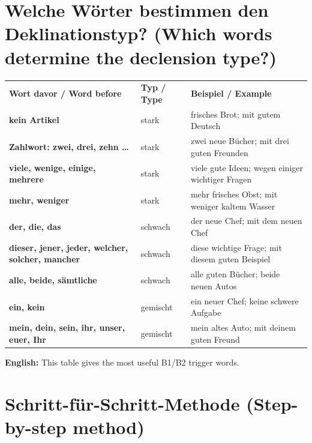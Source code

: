 \documentclass[a4paper,11pt]{article}
\newcommand{\TableEnglish}[1]{{\small\color{SoftGray}\textbf{English: }#1\par}}
\begin{document}
\section{Welche Wörter bestimmen den Deklinationstyp? \textnormal{(Which words determine the declension type?)}}

\begin{longtable}{>{\bfseries}p{3.6cm}|p{4.2cm}|p{7cm}}
\rowcolor{HeaderBlueDark}
\color{white}\textbf{Wort davor / Word before} &
\color{white}\textbf{Typ / Type} &
\color{white}\textbf{Beispiel / Example} \\
kein Artikel & stark & frisches Brot; mit gutem Deutsch \\
Zahlwort: zwei, drei, zehn \ldots & stark & zwei neue Bücher; mit drei guten Freunden \\
viele, wenige, einige, mehrere & stark & viele gute Ideen; wegen einiger wichtiger Fragen \\
mehr, weniger & stark & mehr frisches Obst; mit weniger kaltem Wasser \\
der, die, das & schwach & der neue Chef; mit dem neuen Chef \\
dieser, jener, jeder, welcher, solcher, mancher & schwach & diese wichtige Frage; mit diesem guten Beispiel \\
alle, beide, sämtliche & schwach & alle guten Bücher; beide neuen Autos \\
ein, kein & gemischt & ein neuer Chef; keine schwere Aufgabe \\
mein, dein, sein, ihr, unser, euer, Ihr & gemischt & mein altes Auto; mit deinem guten Freund \\
\end{longtable}

\TableEnglish{This table gives the most useful B1/B2 trigger words.}

\section{Schritt-für-Schritt-Methode \textnormal{(Step-by-step method)}}
\end{document}

